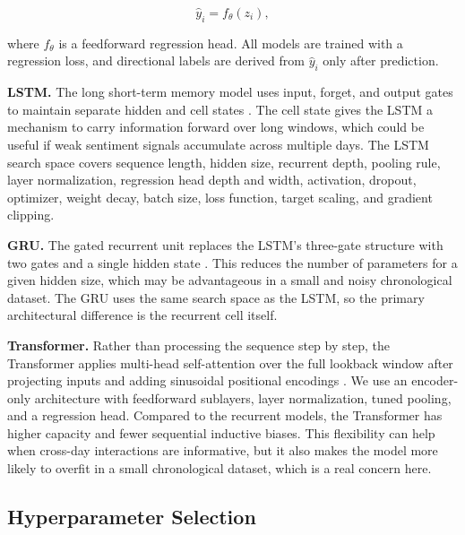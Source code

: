 \documentclass[10pt,twocolumn]{article}
\begin{document}
\begin{equation}
\hat{y}_i = f_{\theta}(z_i),
\end{equation}

where $f_{\theta}$ is a feedforward regression head. All models are trained with a regression loss, and directional labels are derived from $\hat{y}_i$ only after prediction.

\textbf{LSTM.} The long short-term memory model uses input, forget, and output gates to maintain separate hidden and cell states \cite{hochreiter1997lstm}. The cell state gives the LSTM a mechanism to carry information forward over long windows, which could be useful if weak sentiment signals accumulate across multiple days. The LSTM search space covers sequence length, hidden size, recurrent depth, pooling rule, layer normalization, regression head depth and width, activation, dropout, optimizer, weight decay, batch size, loss function, target scaling, and gradient clipping.

\textbf{GRU.} The gated recurrent unit replaces the LSTM's three-gate structure with two gates and a single hidden state \cite{cho2014gru}. This reduces the number of parameters for a given hidden size, which may be advantageous in a small and noisy chronological dataset. The GRU uses the same search space as the LSTM, so the primary architectural difference is the recurrent cell itself.

\textbf{Transformer.} Rather than processing the sequence step by step, the Transformer applies multi-head self-attention over the full lookback window after projecting inputs and adding sinusoidal positional encodings \cite{vaswani2017attention}. We use an encoder-only architecture with feedforward sublayers, layer normalization, tuned pooling, and a regression head. Compared to the recurrent models, the Transformer has higher capacity and fewer sequential inductive biases. This flexibility can help when cross-day interactions are informative, but it also makes the model more likely to overfit in a small chronological dataset, which is a real concern here.

\subsection{Hyperparameter Selection}
\end{document}
